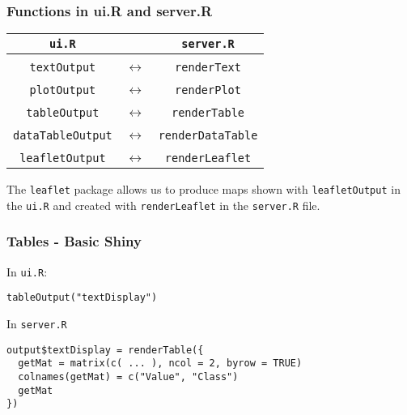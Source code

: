 \documentclass{beamer}
\begin{document}
	\begin{frame}[fragile]
		\frametitle{Functions in ui.R and server.R}
		\begin{center}
		\begin{tabular}{ c c c }
		\verb|ui.R| & & \verb|server.R| \\
		\hline
		\\
		\verb|textOutput| & $\leftrightarrow$ & \verb|renderText| \\
		\\
		\verb|plotOutput| & $\leftrightarrow$ & \verb|renderPlot| \\
		\\
		\verb|tableOutput| & $\leftrightarrow$ & \verb|renderTable| \\
		\\
		\verb|dataTableOutput| & $\leftrightarrow$ & \verb|renderDataTable| \\
		\\
		\verb|leafletOutput| & $\leftrightarrow$ & \verb|renderLeaflet| \\ 
		\end{tabular}
		\end{center}

		\vspace{1em}

		The \verb|leaflet| package allows us to produce maps shown with \verb|leafletOutput| in the \verb|ui.R| and created with \verb|renderLeaflet| in the \verb|server.R| file.

	\end{frame}

	\begin{frame}[fragile]
		\frametitle{Tables - Basic Shiny}
		
		In \verb|ui.R|:
		\begin{exampleblock}{}
		\begin{BVerbatim}
tableOutput("textDisplay")
		\end{BVerbatim}
		\end{exampleblock}{}

		\vspace{1em}

		In \verb|server.R|
		\begin{exampleblock}{}
		\begin{BVerbatim}
output$textDisplay = renderTable({
  getMat = matrix(c( ... ), ncol = 2, byrow = TRUE)
  colnames(getMat) = c("Value", "Class")
  getMat
})
		\end{BVerbatim}
		\end{exampleblock}{}

	\end{frame}
\end{document}
